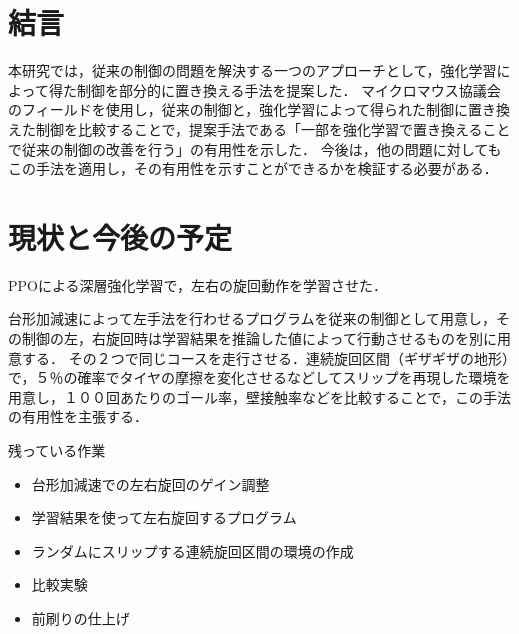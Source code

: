 \documentclass[a4paper,11pt]{jsarticle}
\begin{document}
\section{結言}
本研究では，従来の制御の問題を解決する一つのアプローチとして，強化学習によって得た制御を部分的に置き換える手法を提案した．
マイクロマウス協議会のフィールドを使用し，従来の制御と，強化学習によって得られた制御に置き換えた制御を比較することで，提案手法である「一部を強化学習で置き換えることで従来の制御の改善を行う」の有用性を示した．
今後は，他の問題に対してもこの手法を適用し，その有用性を示すことができるかを検証する必要がある．



























\section{現状と今後の予定}
PPOによる深層強化学習で，左右の旋回動作を学習させた．\par
台形加減速によって左手法を行わせるプログラムを従来の制御として用意し，その制御の左，右旋回時は学習結果を推論した値によって行動させるものを別に用意する．
その２つで同じコースを走行させる．連続旋回区間（ギザギザの地形）で，５％の確率でタイヤの摩擦を変化させるなどしてスリップを再現した環境を用意し，１００回あたりのゴール率，壁接触率などを比較することで，この手法の有用性を主張する．\par
残っている作業
\begin{itemize}
  \item 台形加減速での左右旋回のゲイン調整
  \item 学習結果を使って左右旋回するプログラム
  \item ランダムにスリップする連続旋回区間の環境の作成
  \item 比較実験
  \item 前刷りの仕上げ
\end{itemize}
\end{document}
